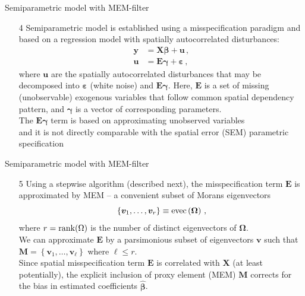 \documentclass{beamer}
\begin{document}
\begin{frame}{Semiparametric model with MEM-filter}
\begin{itemize}
    \item[4] Semiparametric model is established using a misspecification paradigm and based on a regression model with spatially autocorrelated disturbances:
    \begin{equation*} 
    \begin{aligned}
    \bm{y} & = \bm{X\beta} + \bm{u} \,, \\
    \bm{u} & = \bm{E\gamma} + \bm{\varepsilon} \, ,
    \end{aligned}
    \end{equation*}
    where $\bm{u}$ are the spatially autocorrelated disturbances that may be decomposed into $\bm{\varepsilon}$ (white noise) and $\bm{E\gamma}$. Here, $\bm{E}$ is a set of missing (unobservable) exogenous variables that follow common spatial dependency pattern, and $\bm{\gamma}$ is a vector of corresponding parameters.
    \\ \medskip The $\bm{E\gamma}$ term is based on approximating unobserved variables \\and it is not directly comparable with the spatial error (SEM) parametric specification
\end{itemize}
\end{frame}
\begin{frame}{Semiparametric model with MEM-filter}
\begin{itemize}
    \item[5] Using a stepwise algorithm (described next), the misspecification term $\bm{E}$ is approximated by MEM -- a convenient subset of Morans eigenvectors
\begin{equation*} 
\left\lbrace
\bm{v}_1, \dots , \bm{v}_{r} 
\right\rbrace 
\equiv 
\textnormal{evec}
\left(\bm{\Omega}\right) \, ,
\end{equation*}
where $r=\textnormal{rank}(\Omega)$ is the number of distinct eigenvectors of $\bm{\Omega}$. 
\\ \bigskip
We can approximate $\bm{E}$ by a parsimonious subset of eigenvectors $\bm{v}$ such that $\bm{M} = \left\lbrace \bm{v}_1, \dots , \bm{v}_{\ell} \right\rbrace$ where $\ell \leq r$. 
\\ \medskip 
Since spatial misspecification term $\bm{E}$ is correlated with $\bm{X}$ (at least potentially), the explicit inclusion of proxy element (MEM) $\bm{M}$ corrects for the bias in estimated coefficients $\hat{\bm{\beta}}$.
\end{itemize}
\end{frame}
\end{document}
